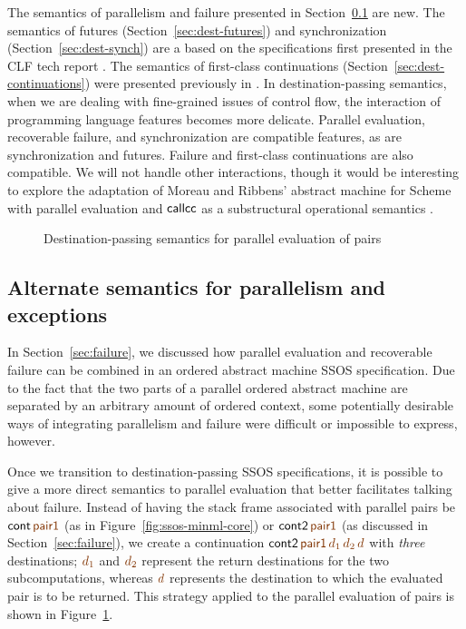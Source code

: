 The semantics of parallelism and failure presented in
Section~\ref{sec:modular-parallelism} are new. The semantics of
futures (Section~\ref{sec:dest-futures}) and synchronization
(Section~\ref{sec:dest-synch}) are a based on the specifications first
presented in the CLF tech report \cite{cervesato02concurrent}. The
semantics of first-class continuations
(Section~\ref{sec:dest-continuations}) were presented previously in
\cite{pfenning04substructural,pfenning09substructural}. In
destination-passing semantics, when we are dealing with fine-grained
issues of control flow, the interaction of programming language
features becomes more delicate.  Parallel evaluation, recoverable
failure, and synchronization are compatible features, as are
synchronization and futures. Failure and first-class continuations are
also compatible. We will not handle other interactions, though it
would be interesting to explore the adaptation of Moreau and Ribbens'
abstract machine for Scheme with parallel evaluation and ${\sf
  callcc}$ as a substructural operational semantics
\cite{moreau96semantics}.

\begin{figure}
\caption{Destination-passing semantics for parallel evaluation of pairs}
\label{fig:dest-pair}
\end{figure}

\subsection{Alternate semantics for parallelism and exceptions}
\label{sec:modular-parallelism}

In Section~\ref{sec:failure}, we discussed how parallel evaluation and
recoverable failure can be combined in an ordered abstract machine
SSOS specification. Due to the fact that the two parts of a parallel
ordered abstract machine are separated by an arbitrary amount of
ordered context, some potentially desirable ways of
integrating parallelism and failure were difficult or impossible to
express, however. 

Once we transition to destination-passing SSOS specifications, it is
possible to give a more direct semantics to parallel evaluation that
better facilitates talking about failure. Instead of having the stack
frame associated with parallel pairs be ${\sf cont}\,\lf{\sf pair1}$ (as
in Figure~\ref{fig:ssos-minml-core}) or ${\sf cont2}\,\lf{\sf pair1}$ (as
discussed in Section~\ref{sec:failure}), we create a continuation
${\sf cont2}\,\lf{\sf pair1}\,\lf{d_1}\,\lf{d_2}\,\lf{d}$ 
with {\it three} destinations;
$\lf{d_1}$ and $\lf{d_2}$ represent the return destinations for the two
subcomputations, whereas $\lf{d}$ represents the destination to which the
evaluated pair is to be returned. This strategy applied to the
parallel evaluation of pairs is shown in Figure~\ref{fig:dest-pair}.

